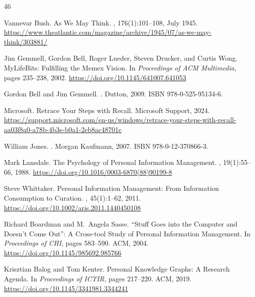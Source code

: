 \documentclass[manuscript,review]{acmart}
\begin{document}
\begin{thebibliography}{46}

Vannevar Bush.
\newblock As We May Think.
, 176(1):101--108, July 1945.
\newblock \url{https://www.theatlantic.com/magazine/archive/1945/07/as-we-may-think/303881/}

Jim Gemmell, Gordon Bell, Roger Lueder, Steven Drucker, and Curtis Wong.
\newblock MyLifeBits: Fulfilling the Memex Vision.
\newblock In {\em Proceedings of ACM Multimedia}, pages 235--238, 2002.
\newblock \url{https://doi.org/10.1145/641007.641053}

Gordon Bell and Jim Gemmell.
.
\newblock Dutton, 2009.
\newblock ISBN 978-0-525-95134-6.

Microsoft.
\newblock Retrace Your Steps with Recall.
\newblock Microsoft Support, 2024.
\newblock \url{https://support.microsoft.com/en-us/windows/retrace-your-steps-with-recall-aa03f8a0-a78b-4b3e-b0a1-2eb8ac48701c}

William Jones.
.
\newblock Morgan Kaufmann, 2007.
\newblock ISBN 978-0-12-370866-3.

Mark Lansdale.
\newblock The Psychology of Personal Information Management.
, 19(1):55--66, 1988.
\newblock \url{https://doi.org/10.1016/0003-6870(88)90199-8}

Steve Whittaker.
\newblock Personal Information Management: From Information Consumption to Curation.
, 45(1):1--62, 2011.
\newblock \url{https://doi.org/10.1002/aris.2011.1440450108}

Richard Boardman and M.~Angela Sasse.
\newblock ``Stuff Goes into the Computer and Doesn't Come Out'': A Cross-tool Study of Personal Information Management.
\newblock In {\em Proceedings of CHI}, pages 583--590. ACM, 2004.
\newblock \url{https://doi.org/10.1145/985692.985766}

Krisztian Balog and Tom Kenter.
\newblock Personal Knowledge Graphs: A Research Agenda.
\newblock In {\em Proceedings of ICTIR}, pages 217--220. ACM, 2019.
\newblock \url{https://doi.org/10.1145/3341981.3344241}


\end{thebibliography}
\end{document}
